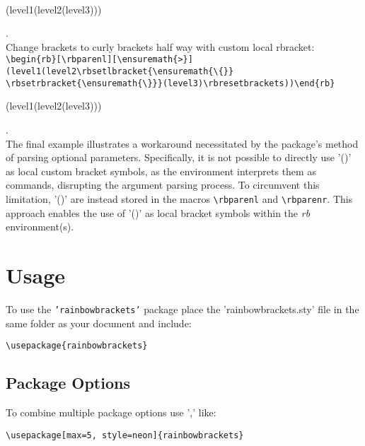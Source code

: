 \documentclass[10pt, a4paper]{article}
\begin{document}
	\\\begin{rb}[\ensuremath{\{}][\ensuremath{\}}](level1(level2(level3)))\end{rb}.
	\\Change brackets to curly brackets half way with custom local rbracket: \\\verb=\begin{rb}[\rbparenl][\ensuremath{>}](level1(level2\rbsetlbracket{\ensuremath{\{}}=
	\\\verb=\rbsetrbracket{\ensuremath{\}}}(level3)\rbresetbrackets))\end{rb}=
	\\\begin{rb}[\rbparenl][\ensuremath{>}](level1(level2\rbsetlbracket{\ensuremath{\{}}\rbsetrbracket{\ensuremath{\}}}(level3)\rbresetbrackets))\end{rb}.
	\\The final example illustrates a workaround necessitated by the package’s method of parsing optional parameters. Specifically, it is not possible to directly use '()' as local custom bracket symbols, as the environment interprets them as commands, disrupting the argument parsing process. To circumvent this limitation, '()' are instead stored in the macros \verb=\rbparenl= and \verb=\rbparenr=. This approach enables the use of '()' as local bracket symbols within the \textit{rb} environment(s).
	\section{Usage}
	To use the \texttt{'rainbowbrackets'} package place the 'rainbowbrackets.sty' file in the same folder as your document and include:
	\begin{lstlisting}[style=A]
			\usepackage{rainbowbrackets}
	\end{lstlisting}
	\subsection{Package Options}
	To combine multiple package options use ',' like:
	\begin{lstlisting}[style=A]
			\usepackage[max=5, style=neon]{rainbowbrackets}
	\end{lstlisting}
\end{document}
